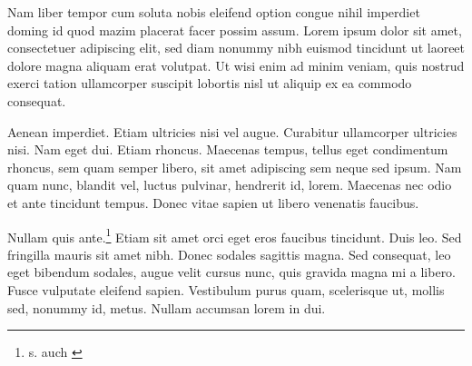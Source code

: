 \documentclass{akdw}
\begin{document}
Nam liber tempor cum soluta nobis \cite{HTML16}  eleifend option congue nihil imperdiet doming id quod mazim 
placerat facer possim assum. Lorem ipsum dolor sit amet, consectetuer adipiscing elit, sed diam 
nonummy nibh euismod tincidunt ut laoreet dolore magna aliquam erat volutpat. Ut wisi enim ad minim 
veniam, quis nostrud exerci tation ullamcorper suscipit lobortis nisl ut aliquip ex ea commodo 
consequat. 




Aenean imperdiet. Etiam ultricies nisi vel augue.  Curabitur ullamcorper 
ultricies nisi. Nam eget dui. Etiam rhoncus. Maecenas tempus, tellus eget condimentum rhoncus, sem 
quam semper libero, sit amet adipiscing sem neque  sed ipsum. Nam quam nunc, blandit vel, luctus 
pulvinar, hendrerit id, lorem. Maecenas nec odio et ante tincidunt tempus. Donec vitae sapien ut 
libero venenatis faucibus.

Nullam quis ante.\footnote{s. auch \cite{Az09,ABC01}} Etiam sit amet orci eget eros faucibus 
tincidunt. 
Duis leo. Sed fringilla mauris sit amet nibh. Donec sodales sagittis magna. Sed consequat, leo eget 
bibendum sodales, augue velit cursus nunc, quis gravida magna mi a libero. Fusce vulputate eleifend 
sapien. Vestibulum purus quam, scelerisque ut, mollis sed, nonummy id, metus. Nullam accumsan lorem 
in dui.


\end{document}
